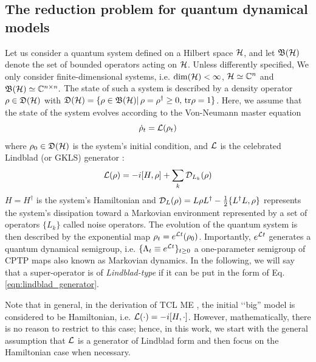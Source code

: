 \documentclass[10pt,aps,pra,twocolumn,showpacs,superscriptaddress,nobalancelastpage,notitlepage,nofootinbib,longbibliography]{revtex4-2}
\begin{document}
\subsection{The reduction problem for quantum dynamical models}
\label{sec:quantum_connection}
Let us consider a quantum system defined on a Hilbert space $\mathcal{H}$, and let $\mathfrak{B}(\mathcal{H})$ denote the set of bounded operators acting on $\mathcal{H}$. Unless differently specified, We only consider finite-dimensional systems, i.e. $\dim(\mathcal{H})<\infty$, $\mathcal{H}\simeq\mathbb{C}^n$ and $\mathfrak{B}(\mathcal{H})\simeq \mathbb{C}^{n\times n}.$
The state of such a system is described by a density operator $\rho\in\mathfrak{D}(\mathcal{H})$ with $\mathfrak{D}(\mathcal{H}) = \{\rho\in\mathfrak{B}(\mathcal{H})|\, \rho=\rho^\dag\geq0,\,{\rm tr}\rho=1\}$. Here, we assume that the state of the system evolves according to the Von-Neumann master equation 
\begin{equation}
    \dot{\rho}_t = \mathcal{L}(\rho_t)
    \label{eq:original_model}
\end{equation}
where $\rho_0\in\mathfrak{D}(\mathcal{H})$ is the system's initial condition, and $\mathcal{L}$ is the celebrated Lindblad (or GKLS) generator \cite{lindblad1976generators,Gorini:1975nb}: 
\begin{equation}
    \mathcal{L}(\rho) = -i[H,\rho] + \sum_k\mathcal{D}_{L_k}(\rho)
    \label{eqn:lindblad_generator}
\end{equation}
$H=H^\dag$ is the system's Hamiltonian and $\mathcal{D}_L(\rho) = L\rho L^\dag - \frac{1}{2}\{L^\dag L, \rho\}$ represents the system's dissipation toward a Markovian environment represented by a set of operators $\{L_k\}$ called noise operators. The evolution of the quantum system is then described by the exponential map $\rho_t = e^{\mathcal{L} t}(\rho_0)$. Importantly, $e^{\mathcal{L} t}$ generates a quantum dynamical semigroup, i.e. $\{\Lambda_t \equiv e^{\mathcal{L} t}\}_{t\geq 0}$ a one-parameter semigroup of CPTP maps also known as Markovian dynamics.
In the following, we will say that a super-operator is of \textit{Lindblad-type} if it can be put in the form of Eq. \eqref{eqn:lindblad_generator}.

Note that in general, in the derivation of TCL ME \cite{shibata_generalized_1977,chaturvedi_time-convolutionless_1979}, the initial ‘‘big'' model is considered to be Hamiltonian, i.e. $\mathcal{L}(\cdot)=-i[H,\cdot]$. However, mathematically, there is no reason to restrict to this case; hence, in this work, we start with the general assumption that $\mathcal{L}$ is a generator of Lindblad form and then focus on the Hamiltonian case when necessary.
\end{document}

